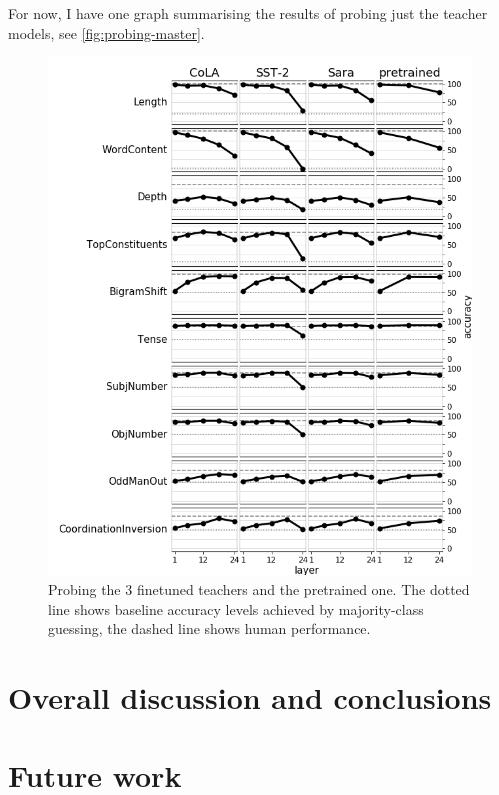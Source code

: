 \documentclass[bsc,frontabs,twoside,singlespacing,parskip,deptreport]{infthesis}
\begin{document}
{{    For now, I have one graph summarising the results of probing just the teacher models, see \autoref{fig:probing-master}.
    \begin{figure}[h!t]
      \centering
      \includegraphics[width=12.5cm]{graphics/probing_master.png}
      \caption{Probing the 3 finetuned teachers and the pretrained one. The dotted line shows baseline accuracy levels achieved by majority-class guessing, the dashed line shows human performance.}
      \label{fig:probing-master}
    \end{figure}
  }
}

\chapter{Overall discussion and conclusions}{}

\chapter{Future work}{}
\end{document}
